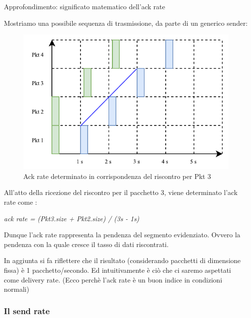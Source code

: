 \begin{approfondimento}{Approfondimento: significato matematico dell'ack rate}

Mostriamo una possibile sequenza di trasmissione, da parte di un generico sender:

\begin{figure}[H]

\center
\caption{Ack rate determinato in corrispondenza del riscontro per Pkt 3}
\includegraphics[scale=1.1]{chapters/bbr/img/ack_rate}

\end{figure}

All'atto della ricezione del riscontro per il pacchetto 3, viene determinato l'ack rate come :

\begin{center}

\textit{ack rate = (Pkt3.size + Pkt2.size) / (3s - 1s)}

\end{center}

Dunque l'ack rate rappresenta la pendenza del segmento evidenziato. Ovvero la pendenza con la quale cresce il tasso di dati riscontrati. \bigskip

In aggiunta si fa riflettere che il risultato (considerando pacchetti di dimensione fissa) è 1 pacchetto/secondo. Ed intuitivamente è ciò che ci saremo aspettati come delivery rate. (Ecco perchè l'ack rate è un buon indice in condizioni normali) \bigskip 

\end{approfondimento}

\subsubsection{Il send rate}

